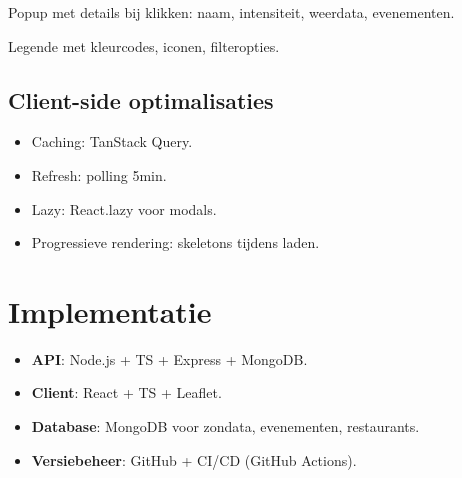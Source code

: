 \documentclass{article}
\begin{document}
Popup met details bij klikken: naam, intensiteit, weerdata, evenementen.

Legende met kleurcodes, iconen, filteropties.

\subsection{Client-side optimalisaties}
\begin{itemize}
    \item Caching: TanStack Query.
    \item Refresh: polling 5min.
    \item Lazy: React.lazy voor modals.
    \item Progressieve rendering: skeletons tijdens laden.
\end{itemize}

\section{Implementatie}
\begin{itemize}
    \item \textbf{API}: Node.js + TS + Express + MongoDB.
    \item \textbf{Client}: React + TS + Leaflet.
    \item \textbf{Database}: MongoDB voor zondata, evenementen, restaurants.
    \item \textbf{Versiebeheer}: GitHub + CI/CD (GitHub Actions).
\end{itemize}
\end{document}
